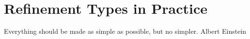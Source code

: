 \chapter{Refinement Types in Practice}\label{chapter:tool}
\makequote
{Everything should be made as simple as possible, but no simpler.}
{Albert Einstein}


\begin{comment}
“One day I will find the right words, and they will be simple.” 
― Jack Kerouac, The Dharma Bums


“Life is really simple, but we insist on making it complicated.” ~ Confucius

“Knowledge is a process of piling up facts; wisdom lies in their simplification.” ~ Martin H. Fischer


“If you can’t explain it to a six year old, you don’t understand it yourself.” ~ Albert Einstein
\end{comment}




\begin{comment}







\chapter{Soundness under Lazy Evaluation}\label{chapter:refinedhaskell}
\makequote{Laziness may appear attractive, but work gives satisfaction.}{Anne Frank}










\end{comment}